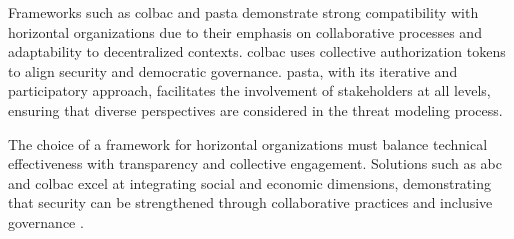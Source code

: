 Frameworks such as \gls{colbac} and \gls{pasta} demonstrate strong compatibility
with horizontal organizations due to their emphasis on collaborative processes
and adaptability to decentralized contexts. \gls{colbac} uses collective
authorization tokens to align security and democratic governance. \gls{pasta},
with its iterative and participatory approach, facilitates the involvement of
stakeholders at all levels, ensuring that diverse perspectives are considered
in the threat modeling process.

The choice of a framework for horizontal organizations must balance technical
effectiveness with transparency and collective engagement. Solutions such as
\gls{abc} and \gls{colbac} excel at integrating social and economic dimensions,
demonstrating that security can be strengthened through collaborative practices
and inclusive governance \cite{AbcCrypto, Colbac}.

